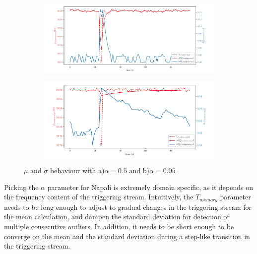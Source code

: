 \begin{figure}[h]
    \centering
    \begin{subfigure}{0.9\textwidth}
        \centering
        \includegraphics[width=1\linewidth]{img/napali_eval/Napali_response_freq_05.pdf}
        \caption{}
        \label{fig:expdes:5:1}
    \end{subfigure}%

    \begin{subfigure}{0.9\textwidth}
        \centering
        \includegraphics[width=1\linewidth]{img/napali_eval/Napali_response_freq_005.pdf}
        \caption{}
        \label{fig:expdes:5:2}
    \end{subfigure}
    \caption{$\mu$ and $\sigma$ behaviour with a)$\alpha = 0.5$ and b)$\alpha=0.05$}
    \label{fig:expdes:5}
\end{figure}

Picking the $\alpha$ parameter for Napali is extremely domain specific, as it depends on the frequency content of the triggering stream.
Intuitively, the $T_{memory}$ parameter needs to be long enough to adjust to gradual changes in the triggering stream for the mean calculation,
and dampen the standard deviation for detection of multiple consecutive outliers.
In addition, it needs to be short enough to be converge on the mean and the standard deviation during a step-like transition in the triggering stream.

